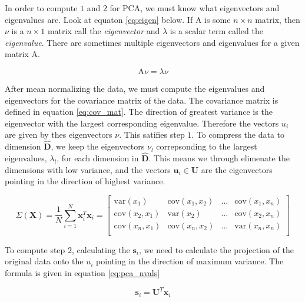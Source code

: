 \message{ !name(main.tex)}\documentclass[11pt]{article}
\begin{document}
In order to compute $1$ and $2$ for PCA, we must know what eigenvectors and eigenvalues are. Look at equaton \ref{eq:eigen} below. If $\mathrm{A}$ is some $n \times n$ matrix, then $\nu$ is a $n \times 1$ matrix call the \emph{eigenvector} and $\lambda$ is a scalar term called the \emph{eigenvalue}. There are sometimes multiple eigenvectors and eigenvalues for a given matrix $\mathrm{A}$.

\begin{equation}\label{eq:eigen}
  \mathrm{A}\nu = \lambda\nu
\end{equation}

After mean normalizing the data, we must compute the eigenvalues and eigenvectors for the covariance matrix of the data. The covariance matrix is defined in equation \ref{eq:cov_mat}. The direction of greatest variance is the eigenvector with the largest corresponding eigenvalue. Therefore the vectors $u_{i}$ are given by thes eigenvectors $\nu$. This satifies step $1$. To compress the data to dimension $\mathbf{\hat{D}}$, we keep the eigenvectors $\nu_{l}$ correpsonding to the largest eigenvalues, $\lambda_{l}$, for each dimension in $\mathbf{\hat{D}}$. This means we through elimenate the dimensions with low variance, and the vectors $\mathbf{u}_{i} \in \mathbf{U}$ are the eigenvectors pointing in the direction of highest variance.

\begin{equation}\label{eq:cov_mat}
  \Sigma(\mathbf{X}) = \frac{1}{N}\sum_{i=1}^{N}\mathbf{x}_{i}^{T}\mathbf{x}_{i} = 
  \begin{bmatrix}
          \mathrm{var}(x_{1}) & \mathrm{cov}(x_{1},x_{2}) & \ldots & \mathrm{cov}(x_{1},x_{n}) \\
          \mathrm{cov}(x_{2},x_{1}) & \mathrm{var}(x_{2}) & \ldots & \mathrm{cov}(x_{2},x_{n}) \\
          \mathrm{cov}(x_{n},x_{1}) & \mathrm{cov}(x_{n},x_{2}) & \ldots & \mathrm{var}(x_{n},x_{n}) \\
  \end{bmatrix}
\end{equation}

To compute step $2$, calculating the $\mathbf{s}_{i}$, we need to calculate the projection of the original data onto the $u_{i}$ pointing in the direction of maximum variance. The formula is given in equation \ref{eq:pca_nvals}

\begin{equation}\label{eq:pca_nvals}
  \mathbf{s}_{i} = \mathbf{U}^{T}\mathbf{x}_{i}
\end{equation}
\end{document}

